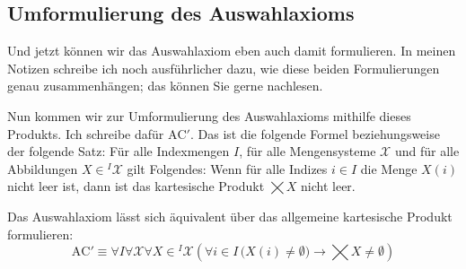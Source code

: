 \subsection{Umformulierung des Auswahlaxioms}

\begin{spoken-clean}[00:24:41 - 00:27:02]
Und jetzt können wir das Auswahlaxiom eben auch damit formulieren. In meinen Notizen schreibe ich noch ausführlicher dazu, wie diese beiden Formulierungen genau zusammenhängen; das können Sie gerne nachlesen.

Nun kommen wir zur Umformulierung des Auswahlaxioms mithilfe dieses Produkts. Ich schreibe dafür $\text{AC}'$. Das ist die folgende Formel beziehungsweise der folgende Satz: Für alle Indexmengen $I$, für alle Mengensysteme $\mathcal{X}$ und für alle Abbildungen $X \in {}^{I}\!\mathcal{X}$ gilt Folgendes: Wenn für alle Indizes $i \in I$ die Menge $X(i)$ nicht leer ist, dann ist das kartesische Produkt $\bigtimes X$ nicht leer.
\end{spoken-clean}

\begin{math-stroke}
Das Auswahlaxiom lässt sich äquivalent über das allgemeine kartesische Produkt formulieren:
\begin{equation}
\label{eq:ac-prime}
\text{AC}' \equiv \forall I \forall \mathcal{X} \forall X \in {}^{I}\!\mathcal{X} \left( \forall i \in I \, \bigl( X(i) \neq \emptyset \bigr) \rightarrow \bigtimes X \neq \emptyset \right)
\end{equation}

\end{math-stroke}

